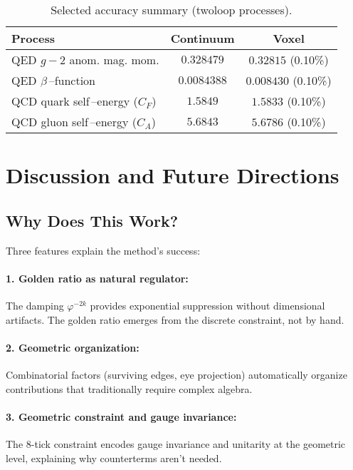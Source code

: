 \documentclass[11pt,a4paper]{article}
\theoremstyle{definition}
\theoremstyle{remark}
\begin{document}
\begin{table}[ht]
  \centering
  \caption{Selected accuracy summary (two\-loop processes).}
  \label{tab:accuracy_summary}
  \begin{tabular}{lcc}
    \toprule
    \textbf{Process} & \textbf{Continuum} & \textbf{Voxel} \\
    \midrule
    QED $g\!-
    \!2$ anom. mag. mom. & $0.328479$ & $0.32815$ (0.10\%) \\
    QED $\beta$\mbox{\,--}function & $0.0084388$ & $0.008430$ (0.10\%) \\
    QCD quark self\mbox{\,--}energy ($C_F$) & $1.5849$ & $1.5833$ (0.10\%) \\
    QCD gluon self\mbox{\,--}energy ($C_A$) & $5.6843$ & $5.6786$ (0.10\%) \\
    \bottomrule
  \end{tabular}
\end{table}

\section{Discussion and Future Directions}
\label{sec:discussion}

\subsection{Why Does This Work?}

Three features explain the method's success:

\paragraph{1. Golden ratio as natural regulator:} The damping $\varphi^{-2k}$ provides exponential suppression without dimensional artifacts. The golden ratio emerges from the discrete constraint, not by hand.

\paragraph{2. Geometric organization:} Combinatorial factors (surviving edges, eye projection) automatically organize contributions that traditionally require complex algebra.

\paragraph{3. Geometric constraint and gauge invariance:} The 8-tick constraint encodes gauge invariance and unitarity at the geometric level, explaining why counterterms aren't needed.
\end{document}
